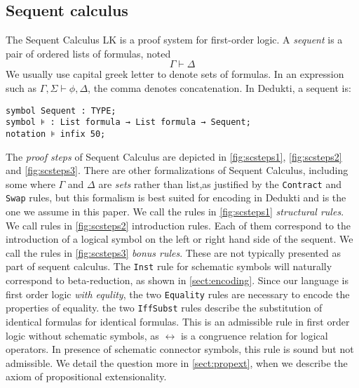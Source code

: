 \documentclass{article}
\begin{document}
	\subsection{Sequent calculus}
	The Sequent Calculus LK is a proof system for first-order logic. A \textit{sequent} is a pair of ordered lists of formulas, noted
	$$
	\Gamma \vdash \Delta
	$$
	We usually use capital greek letter to denote sets of formulas. In an expression such as $\Gamma, \Sigma \vdash \phi, \Delta$, the comma denotes concatenation. In Dedukti, a sequent is:
	\begin{lstlisting}[language=Dialekto]
symbol Sequent : TYPE;
symbol ⊧ : List formula → List formula → Sequent;
notation ⊧ infix 50;
	\end{lstlisting}
	The \textit{proof steps} of Sequent Calculus are depicted in \autoref{fig:scsteps1}, \autoref{fig:scsteps2} and \autoref{fig:scsteps3}. There are other formalizations of Sequent Calculus, including some where $\Gamma$ and $\Delta$ are \textit{sets} rather than list,as justified by the \texttt{Contract} and \texttt{Swap} rules, but this formalism is best suited for encoding in Dedukti and is the one we assume in this paper.
	We call the rules in \autoref{fig:scsteps1} \textit{structural rules}. We call rules in \autoref{fig:scsteps2} introduction rules. Each of them correspond to the introduction of a logical symbol on the left or right hand side of the sequent.
	We call the rules in \autoref{fig:scsteps3} \textit{bonus rules}. These are not typically presented as part of sequent calculus. 
	The \texttt{Inst} rule for schematic symbols will naturally correspond to beta-reduction, as shown in \autoref{sect:encoding}.
	Since our language is first order logic \textit{with equlity}, the two \texttt{Equality} rules are necessary to encode the properties of equality. the two \texttt{IffSubst} rules describe the substitution of identical formulas for identical formulas. This is an admissible rule in first order logic without schematic symbols, as $\leftrightarrow$ is a congruence relation for logical operators. In presence of schematic connector symbols, this rule is sound but not admissible. We detail the question more in \autoref{sect:propext}, when we describe the axiom of propositional extensionality.
	
\end{document}
